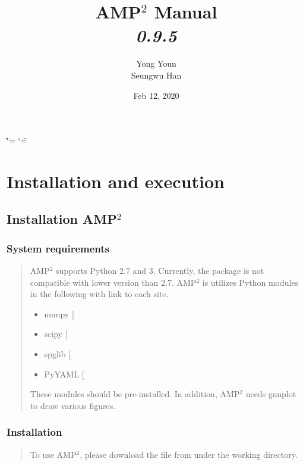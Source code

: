 \documentclass[letterpaper,10pt,english]{sphinxmanual}
\title{AMP$^\text{2}$ Manual \\ \textit{0.9.5}}
\date{Feb 12, 2020}
\author{Yong Youn \\ Seungwu Han}
\begin{document}
\ifdefined\shorthandoff
  \ifnum\catcode`\=\string=\active\shorthandoff{=}\fi
  \ifnum\catcode`\"=\active{}\fi
\fi

\pagestyle{empty}
\sphinxmaketitle
\pagestyle{plain}
\sphinxtableofcontents
\pagestyle{normal}
\label{\detokenize{index::doc}}



\chapter{Installation and execution}
\label{\detokenize{Installation/Installation:installation-and-execution}}\label{\detokenize{Installation/Installation::doc}}

\section{Installation AMP$^{\text{2}}$}
\label{\detokenize{Installation/Installation:installation-amp2}}

\subsection{System requirements}
\label{\detokenize{Installation/Installation:system-requirements}}\begin{quote}

AMP$^{\text{2}}$ supports Python 2.7 and 3. Currently, the package is not compatible
with lower version than 2.7. AMP$^{\text{2}}$ is utilizes Python modules
in the following with link to each site.
\begin{itemize}
\item {} 
numpy {[}\sphinxurl{https://www.numpy.org}{]}

\item {} 
scipy {[}\sphinxurl{https://www.scipy.org}{]}

\item {} 
spglib {[}\sphinxurl{https://atztogo.github.io/spglib}{]}

\item {} 
PyYAML {[}\sphinxurl{https://pypi.org/project/PyYAML}{]}

\end{itemize}

These modules should be pre-installed. In addition, AMP$^{\text{2}}$ needs gnuplot to draw
various figures.
\end{quote}


\subsection{Installation}
\label{\detokenize{Installation/Installation:installation}}\begin{quote}

To use AMP$^{\text{2}}$, please download the file from  under the
working directory.
\end{quote}
\end{document}

